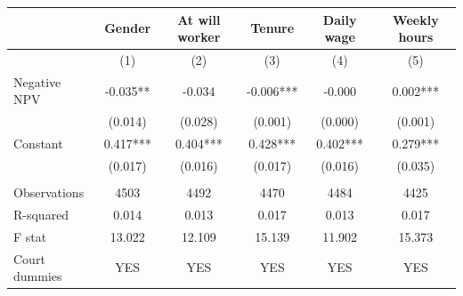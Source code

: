 \begin{tabular}{lccccc}
\toprule
      & Gender & At will worker & Tenure & Daily wage & Weekly hours \\
\midrule
\midrule
      & (1)   & (2)   & (3)   & (4)   & (5) \\
\midrule
\midrule
Negative NPV & -0.035** & -0.034 & -0.006*** & -0.000 & 0.002*** \\
      & (0.014) & (0.028) & (0.001) & (0.000) & (0.001) \\
Constant & 0.417*** & 0.404*** & 0.428*** & 0.402*** & 0.279*** \\
      & (0.017) & (0.016) & (0.017) & (0.016) & (0.035) \\
      &       &       &       &       &  \\
\midrule
Observations & 4503  & 4492  & 4470  & 4484  & 4425 \\
R-squared & 0.014 & 0.013 & 0.017 & 0.013 & 0.017 \\
F stat & 13.022 & 12.109 & 15.139 & 11.902 & 15.373 \\
Court dummies & YES   & YES   & YES   & YES   & YES \\
\bottomrule
\bottomrule
\end{tabular}%
